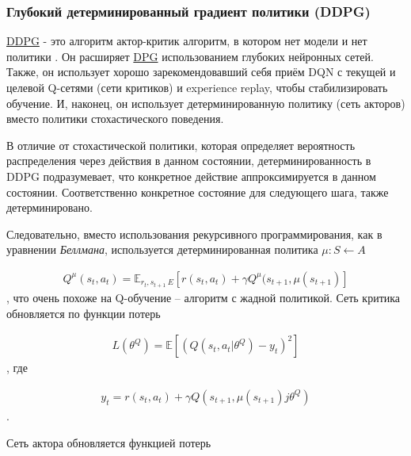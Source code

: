 \subsubsection{Глубокий детерминированный градиент политики (DDPG)}

\hyperref[acr:ddpg]{DDPG} - это алгоритм актор-критик алгоритм, в котором нет модели и нет политики \cite{lillicrap2015continuous}. Он расширяет \hyperref[acr:dpg]{DPG} использованием глубоких нейронных сетей. Также, он использует хорошо зарекомендовавший себя приём DQN с текущей и целевой Q-сетями (сети критиков) и experience replay, чтобы стабилизировать обучение. И, наконец, он использует детерминированную политику (сеть акторов) вместо политики стохастического поведения.

В отличие от стохастической политики, которая определяет вероятность распределения через действия в данном состоянии, детерминированность в DDPG подразумевает, что конкретное действие аппроксимируется в данном состоянии. Соответственно конкретное состояние для следующего шага, также детерминировано.

Следовательно, вместо использования рекурсивного программирования, как в уравнении {\itshape Беллмана}, используется детерминированная политика $\mu : S \leftarrow A$ \cite{lillicrap2015continuous}

\begin{equation}
	\label{eq:ch1-ddpg-1}
	\begin{multlined}
		Q^\mu (s_t, a_t) = \mathbb{E}_{r_t, s_{t+1}~E}[r(s_t, a_t) + \gamma Q^\mu(s_{t+1}, \mu(s_{t+1})]
	\end{multlined} %
\end{equation}, что очень похоже на Q-обучение – алгоритм с жадной политикой. Сеть критика обновляется по функции потерь

\begin{equation}
	\label{eq:ch1-ddpg-1}
	\begin{multlined}
		L(\theta^Q) = \mathbb{E}[(Q(s_t, a_t|\theta^Q) - y_t)^2]
	\end{multlined}
\end{equation}, где

\begin{equation}
	\label{eq:ch1-ddpg-3}
	\begin{multlined}
		y_t = r(s_t, a_t) + \gamma Q(s_{t+1}, \mu(s_{t+1})j\theta^Q)
	\end{multlined}
\end{equation}.

Сеть актора обновляется функцией потерь


